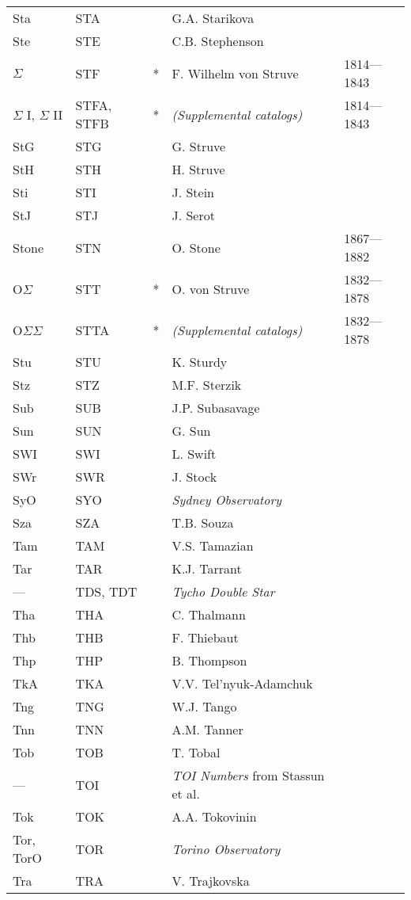 \begin{longtable}{l|l|c|p{59mm}|l}
Sta & STA &   & G.A. Starikova & \\
Ste & STE &   & C.B. Stephenson & \\
$\Sigma$ & STF & *  & F. Wilhelm von Struve & 1814---1843 \\
$\Sigma$ I, $\Sigma$ II & STFA, STFB & *  & \emph{(Supplemental catalogs)} & 1814---1843 \\
StG & STG &   & G. Struve & \\
StH & STH &   & H. Struve & \\
Sti & STI &   & J. Stein & \\
StJ & STJ &   & J. Serot & \\
Stone & STN &   & O. Stone & 1867---1882 \\
O$\Sigma$ & STT & *  & O. von Struve & 1832---1878 \\
O$\Sigma\Sigma$ & STTA & *  & \emph{(Supplemental catalogs)} & 1832---1878 \\
Stu & STU &   & K. Sturdy & \\
Stz & STZ &   & M.F. Sterzik & \\
Sub & SUB &   & J.P. Subasavage & \\
Sun & SUN &   & G. Sun & \\
SWI & SWI &   & L. Swift & \\
SWr & SWR &   & J. Stock & \\
SyO & SYO &   & \emph{Sydney Observatory} & \\
Sza & SZA &   & T.B. Souza & \\\midrule
Tam & TAM &   & V.S. Tamazian & \\
Tar & TAR &   & K.J. Tarrant & \\
--- & TDS, TDT &   & \emph{Tycho Double Star} & \\
Tha & THA &   & C. Thalmann & \\
Thb & THB &   & F. Thiebaut & \\
Thp & THP &   & B. Thompson & \\
TkA & TKA &   & V.V. Tel'nyuk-Adamchuk & \\
Tng & TNG &   & W.J. Tango & \\
Tnn & TNN &   & A.M. Tanner & \\
Tob & TOB &   & T. Tobal  & \\
--- & TOI &   & \emph{TOI Numbers} from Stassun et al. & \\
Tok & TOK &   & A.A. Tokovinin & \\
Tor, TorO & TOR &   & \emph{Torino Observatory} & \\
Tra & TRA &   & V. Trajkovska & \\

\end{longtable}
